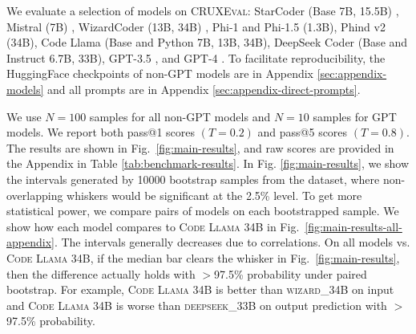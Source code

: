 \documentclass{article}
\newcommand{\benchmark}{\textsc{CRUXEval}\xspace}
\newcommand{\codellamalarge}{\textsc{Code Llama 34B}\xspace}
\begin{document}
We evaluate a selection of models on \benchmark: StarCoder (Base 7B, 15.5B) \citep{li2023starcoder}, Mistral (7B) \citep{jiang2023mistral}, WizardCoder (13B, 34B) \citep{luo2023wizardcoder}, Phi-1 \cite{gunasekar2023textbooks} and Phi-1.5 \citep{li2023textbooks} (1.3B), Phind v2 \citep{Phind} (34B), Code Llama \citep{roziere2023code} (Base and Python 7B, 13B, 34B), DeepSeek Coder (Base and Instruct 6.7B, 33B), GPT-3.5 \citep{brown2020language, ouyang2022training}, and GPT-4 \citep{openai2023gpt}. To facilitate reproducibility, the HuggingFace checkpoints of non-GPT models are in Appendix \ref{sec:appendix-models} and all prompts are in Appendix \ref{sec:appendix-direct-prompts}. 

We use $N=100$ samples for all non-GPT models and $N=10$ samples for GPT models. We report both pass@1 scores $(T=0.2)$ and pass@5 scores $(T=0.8)$. The results are shown in Fig.~\ref{fig:main-results}, and raw scores are provided in the Appendix in Table \ref{tab:benchmark-results}. In Fig. \ref{fig:main-results}, we show the intervals generated by 10000 bootstrap samples from the dataset, where non-overlapping whiskers would be significant at the 2.5\% level. To get more statistical power, we compare pairs of models on each bootstrapped sample. We show how each model compares to \codellamalarge in Fig.~\ref{fig:main-results-all-appendix}.
The intervals generally decreases due to correlations. On all models vs. \codellamalarge, if the median bar clears the whisker in Fig.~\ref{fig:main-results}, then the difference actually holds with $>$97.5\% probability under paired bootstrap. For example, \codellamalarge is better than \textsc{wizard\_34B} on input and \codellamalarge is worse than \textsc{deepseek\_33B} on output prediction with $>$97.5\% probability.
\end{document}
